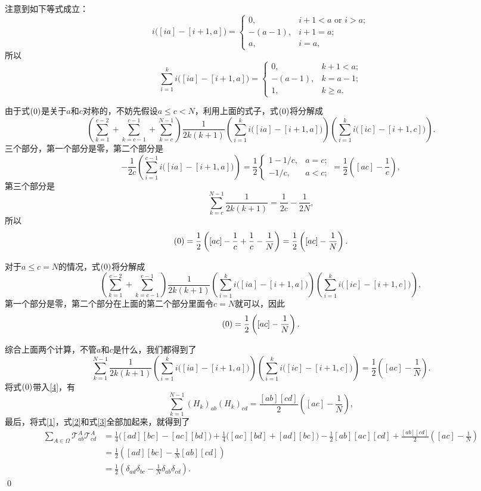 \documentclass[10pt]{article}
\begin{document}
注意到如下等式成立：
\[
	i\bigl([ia]-[i+1,a]\bigr)=
	\begin{cases}
	0,& i+1<a \text{ or } i>a;\\
	-(a-1),&i+1=a;\\
	a,&i=a,
	\end{cases}
\]
所以
\[
	\sum_{i=1}^ki\bigl([ia]-[i+1,a]\bigr)=
	\begin{cases}
	0,& k+1<a;\\
	-(a-1),&k=a-1;\\
	1,&k\geq a.
	\end{cases}
\]

由于式$(\theequation)$是关于$a$和$c$对称的，不妨先假设$a\leq c<N$，利用上面的式子，式$(\theequation)$将分解成
\[
\left(\sum_{k=1}^{c-2}+\sum_{k=c-1}^{c-1}+\sum_{k=c}^{N-1}\right)\frac{1}{2k(k+1)}\left(\sum_{i=1}^k i\bigl([ia]-[i+1,a]\bigr)\right)\left(\sum_{i=1}^k i\bigl([ic]-[i+1,c]\bigr)\right).
\]
三个部分，第一个部分是零，第二个部分是
\[
	-\frac{1}{2c}\left(\sum_{i=1}^{c-1} i\bigl([ia]-[i+1,a]\bigr)\right)=\frac{1}{2}
	\begin{cases}
	1-1/c,& a=c;\\
	-1/c,&a<c;
	\end{cases}=\frac{1}{2}\left([ac]-\frac{1}{c}\right),
\]
第三个部分是
\[
	\sum_{k=c}^{N-1}\frac{1}{2k(k+1)}=\frac{1}{2c}-\frac{1}{2N},
\]
所以
\[
	(\theequation)=\frac{1}{2}\left([ac]-\frac{1}{c}+\frac{1}{c}-\frac{1}{N}\right)=\frac{1}{2}\left([ac]-\frac{1}{N}\right).
\]

对于$a\leq c=N$的情况，式$(\theequation)$将分解成
\[
\left(\sum_{k=1}^{c-2}+\sum_{k=c-1}^{c-1}\right)\frac{1}{2k(k+1)}\left(\sum_{i=1}^k i\bigl([ia]-[i+1,a]\bigr)\right)\left(\sum_{i=1}^k i\bigl([ic]-[i+1,c]\bigr)\right),
\]
第一个部分是零，第二个部分在上面的第二个部分里面令$c=N$就可以，因此
\[
	(\theequation)=\frac{1}{2}\left([ac]-\frac{1}{N}\right).
\]

综合上面两个计算，不管$a$和$c$是什么，我们都得到了
\begin{equation}
	\sum_{k=1}^{N-1}\frac{1}{2k(k+1)}\left(\sum_{i=1}^k i\bigl([ia]-[i+1,a]\bigr)\right)\left(\sum_{i=1}^k i\bigl([ic]-[i+1,c]\bigr)\right)=\frac{1}{2}\left([ac]-\frac{1}{N}\right).
\end{equation}
将式$(\theequation)$带入\eqref{4}，有
\begin{equation}
\label{3}
\sum_{k=1}^{N-1}(H_k)_{ab}(H_k)_{cd}=\frac{[ab][cd]}{2}\left([ac]-\frac{1}{N}\right),
\end{equation}
最后，将式\eqref{1}，式\eqref{2}和式\eqref{3}全部加起来，就得到了
\[
\begin{split}
	\sum_{A\in \Omega}\mathcal{T}^A_{ab}\mathcal{T}^A_{cd}&=\frac{1}{4}\bigl([ad][bc]-[ac][bd]\bigr)+\frac{1}{4}\bigl([ac][bd]+[ad][bc]\bigr)-\frac{1}{2}[ab][ac][cd]+\frac{[ab][cd]}{2}\left([ac]-\frac{1}{N}\right)\\
	&=\frac{1}{2}\left([ad][bc]-\frac{1}{N}[ab][cd]\right)\\
	&=\frac{1}{2}\left(\delta_{ad}\delta_{bc}-\frac{1}{N}\delta_{ab}\delta_{cd}\right).
\end{split}
\]
\qed
\end{document}
